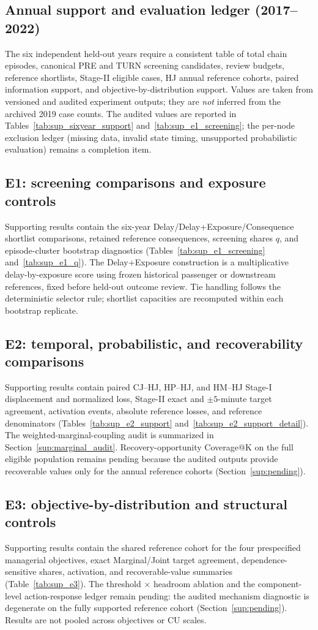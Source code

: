 \documentclass[10pt,a4paper]{article}
\numberwithin{equation}{section}
\begin{document}
\subsection{Annual support and evaluation ledger (2017--2022)}
The six independent held-out years require a consistent table of total chain episodes, canonical PRE and TURN screening candidates, review budgets, reference shortlists, Stage-II eligible cases, HJ annual reference cohorts, paired information support, and objective-by-distribution support. Values are taken from versioned and audited experiment outputs; they are \emph{not} inferred from the archived 2019 case counts. The audited values are reported in Tables~\ref{tab:sup_sixyear_support} and~\ref{tab:sup_e1_screening}; the per-node exclusion ledger (missing data, invalid state timing, unsupported probabilistic evaluation) remains a completion item.

\subsection{E1: screening comparisons and exposure controls}
Supporting results contain the six-year Delay/Delay+Exposure/Consequence shortlist comparisons, retained reference consequences, screening shares $q$, and episode-cluster bootstrap diagnostics (Tables~\ref{tab:sup_e1_screening} and~\ref{tab:sup_e1_q}). The Delay+Exposure construction is a multiplicative delay-by-exposure score using frozen historical passenger or downstream references, fixed before held-out outcome review. Tie handling follows the deterministic selector rule; shortlist capacities are recomputed within each bootstrap replicate.

\subsection{E2: temporal, probabilistic, and recoverability comparisons}
Supporting results contain paired CJ--HJ, HP--HJ, and HM--HJ Stage-I displacement and normalized loss, Stage-II exact and $\pm5$-minute target agreement, activation events, absolute reference losses, and reference denominators (Tables~\ref{tab:sup_e2_support} and~\ref{tab:sup_e2_support_detail}). The weighted-marginal-coupling audit is summarized in Section~\ref{sup:marginal_audit}. Recovery-opportunity Coverage@K on the full eligible population remains pending because the audited outputs provide recoverable values only for the annual reference cohorts (Section~\ref{sup:pending}).

\subsection{E3: objective-by-distribution and structural controls}
Supporting results contain the shared reference cohort for the four prespecified managerial objectives, exact Marginal/Joint target agreement, dependence-sensitive shares, activation, and recoverable-value summaries (Table~\ref{tab:sup_e3}). The threshold $\times$ headroom ablation and the component-level action-response ledger remain pending: the audited mechanism diagnostic is degenerate on the fully supported reference cohort (Section~\ref{sup:pending}). Results are not pooled across objectives or CU scales.
\end{document}
